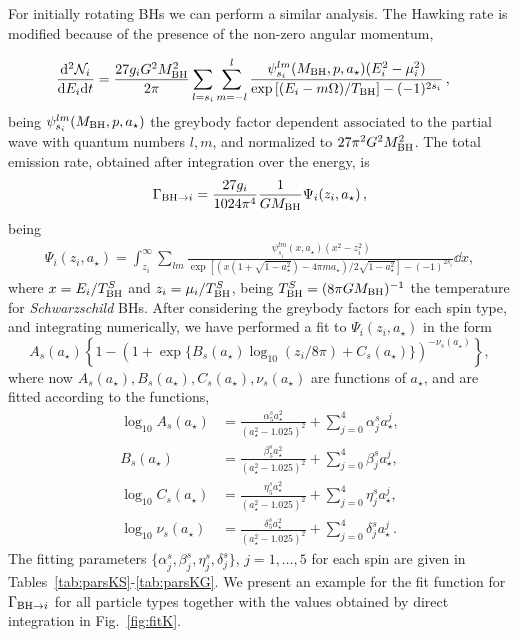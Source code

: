 \documentclass[aps,prd,reprint,twocolumn,preprintnumbers,floatfix,nofootinbib]{revtex4-1}
\newcommand{\TBH}{T_{\rm BH}}
\newcommand{\MBH}{M_{\rm BH}}
\newcommand{\as}{a_\star}
\begin{document}
For initially rotating BHs we can perform a similar analysis. The Hawking rate is modified because of the presence of the non-zero angular momentum, 
\begin{widetext}
\begin{align}
\frac{\dd^2 \mathcal{N}_{i}}{\dd E_i\dd t}&=\frac{27g_i G^2\MBH^2}{2\pi} \sum_{l=s_i}\sum_{m=-l}^l\frac{\psi_{s_i}^{lm}(\MBH,p,a_\star)(E_i^2-\mu_i^2)}{\exp\left[(E_i - m\Omega)/\TBH\right]-( -1)^{2s_i}}\,,
\end{align}
being $\psi_{s_i}^{lm}(\MBH,p,a_\star)$ the greybody factor dependent associated to the partial wave with quantum numbers $l,m$, and normalized to $27\pi^2 G^2\MBH^2$. The total emission rate, obtained after integration over the energy, is
\begin{align}\label{eq:GamKBHA}
    \Gamma_{{\rm BH} \to i}= \frac{27 g_i}{1024\pi^4}\frac{1}{G\MBH}\Psi_i (z_i,\as)\,,
\end{align}
being
\begin{align}\label{eq:GamKBHB}
    \Psi_i (z_i,\as)= \int_{z_i}^\infty\sum_{lm}\frac{\,\psi_{s_i}^{lm}(x,\as)(x^2-z_i^2)}{\exp[(x(1+\sqrt{1-\as^2})-4\pi m\as)/2\sqrt{1-\as^2}]-(-1)^{2s_i}}\dd{x},
\end{align}
where $x = E_i/\TBH^S$ and $z_i=\mu_i/\TBH^S$, being $\TBH^S=(8\pi G \MBH)^{-1}$ the temperature for \emph{Schwarzschild} BHs. After considering the greybody factors for each spin type, and integrating numerically, we have performed a fit to $\Psi_i (z_i,\as)$ in the form 
\begin{equation}\label{eq:fitfK} A_s(\as)\left\{1-(1+\exp\{B_s(\as)\log_{10}(z_i/8\pi)+C_s(\as)\})^{-\nu_s(\as)}\right\},
\end{equation}
where now $A_s(\as),B_s(\as),C_s(\as),\nu_s(\as)$ are functions of $\as$, and are fitted according to the functions,
\begin{subequations}\label{eq:ABCn-Kerr}
\begin{align}
    \log_{10} A_s(\as) &= \frac{\alpha^s_5 \as^2}{(\as^2-1.025)^2} + \sum_{j=0}^4 \alpha^s_j\as^j,\\
    B_s(\as) &= \frac{\beta^s_5 \as^2}{(\as^2-1.025)^2} + \sum_{j=0}^4 \beta^s_j\as^j,\\
    \log_{10} C_s(\as) &= \frac{\eta^s_5 \as^2}{(\as^2-1.025)^2} + \sum_{j=0}^4 \eta^s_j\as^j,\\
    \log_{10} \nu_s(\as) &= \frac{\delta^s_5 \as^2}{(\as^2-1.025)^2} + \sum_{j=0}^4 \delta^s_j\as^j\,.
\end{align}
\end{subequations}
The fitting parameters $\{\alpha^s_j,\beta^s_j,\eta^s_j,\delta^s_j\}$, $j=1,\ldots,5$ for each spin are given in Tables~\ref{tab:parsKS}-\ref{tab:parsKG}. We present an example for the fit function for $\Gamma_{{\rm BH} \to i}$ for all particle types together with the values obtained by direct integration in Fig.~\ref{fig:fitK}.


\end{widetext}
\end{document}
